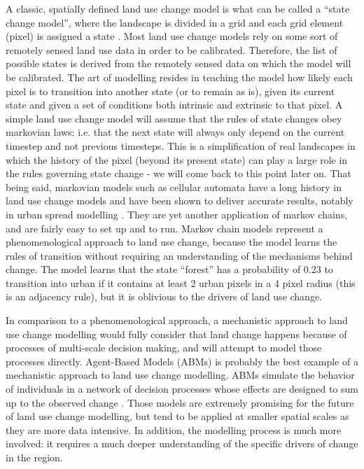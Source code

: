 A classic, spatially defined land use change model is what can be called a “state change model”, where the landscape is divided in a grid and each grid element (pixel) is assigned a state \citep{daniel_state-and-transition_2016}. Most land use change models rely on some sort of remotely sensed land use data in order to be calibrated. Therefore, the list of possible states is derived from the remotely sensed data on which the model will be calibrated. The art of modelling resides in teaching the model how likely each pixel is to transition into another state (or to remain as is), given its current state and given a set of conditions both intrinsic and extrinsic to that pixel. A simple land use change model will assume that the rules of state changes obey markovian laws: i.e. that the next state will always only depend on the current timestep and not previous timesteps. This is a simplification of real landscapes in which the history of the pixel (beyond its present state) can play a large role in the rules governing state change - we will come back to this point later on. That being said, markovian models such as cellular automata have a long history in land use change models and have been shown to deliver accurate results, notably in urban spread modelling \citep{soares-filho_dinamicastochastic_2002, jokar_arsanjani_integration_2013, iacono_markov_2015}. They are yet another application of markov chains, and are fairly easy to set up and to run. Markov chain models represent a phenomenological approach to land use change, because the model learns the rules of transition without requiring an understanding of the mechanisms behind change. The model learns that the state “forest” has a probability of 0.23 to transition into urban if it contains at least 2 urban pixels in a 4 pixel radius (this is an adjacency rule), but it is oblivious to the drivers of land use change.

In comparison to a phenomenological approach, a mechanistic approach to land use change modelling would fully consider that land change happens because of processes of multi-scale decision making, and will attempt to model those processes directly. Agent-Based Models (ABMs) is probably the best example of a mechanistic approach to land use change modelling. ABMs simulate the behavior of individuals in a network of decision processes whose effects are designed to sum up to the observed change \citep{parker_agent-based_2002, filatova_spatial_2013}. Those models are extremely promising for the future of land use change modelling, but tend to be applied at smaller spatial scales as they are more data intensive. In addition, the modelling process is much more involved: it requires a much deeper understanding of the specific drivers of change in the region.

